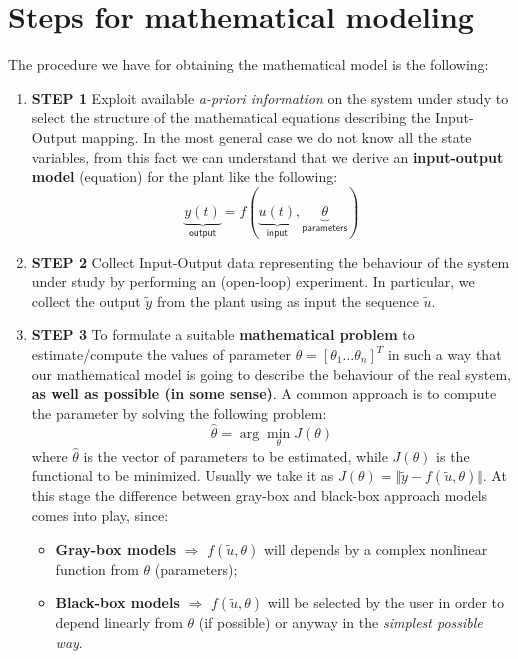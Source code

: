 \section{Steps for mathematical modeling}
The procedure we have for obtaining the mathematical model  is the following:
\begin{enumerate}
    \item \textsf{\textbf{STEP 1}} Exploit available \textit{a-priori information} on the system under study to select the structure of the mathematical equations describing the Input-Output mapping. In the most general case we do not know all the state variables, from this fact we can understand that we derive an \textbf{input-output model} (equation) for the plant like the following:
    \begin{equation}
        \underbrace{y(t)}_{\textsf{output}}=
        f( \underbrace{u(t)}_{\textsf{input}}, \underbrace{\theta}_{\textsf{parameters}})
    \end{equation}
    \item \textsf{\textbf{STEP 2}} Collect Input-Output data representing the behaviour of the system under study by performing an (open-loop) experiment. In particular, we collect the output $\tilde{y}$ from the plant using as input the sequence $\tilde{u}$.
    \item \textsf{\textbf{STEP 3}} To formulate a suitable \textbf{mathematical problem} to estimate/compute the values of parameter $\theta=[\theta_1...\theta_n]^T$ in such a way that our mathematical model is going to describe the behaviour of the real system, \textbf{as well as possible (in some sense)}. A common approach is to compute the parameter by solving the following problem:
    \begin{equation} \label{eq:problem}
        \hat{\theta} = \arg\min_{\theta}{J(\theta)}
    \end{equation}
    where $\hat{\theta}$ is the vector of parameters to be estimated, while $J(\theta)$ is the functional to be minimized. Usually we take it as $J(\theta)=\Vert \tilde{y}-f(\tilde{u}, \theta)\Vert$.
    At this stage the difference between gray-box and black-box approach models comes into play, since:
    \begin{itemize}
        \item \textbf{Gray-box models} $\Longrightarrow$ $f(\tilde{u}, \theta)$ will depends by a complex nonlinear function from $\theta$ (parameters); 
        \item \textbf{Black-box models} $\Longrightarrow$ $f(\tilde{u}, \theta)$ will be selected by the user in order to depend linearly from $\theta$ (if possible) or anyway in the \textit{simplest possible way}.
    \end{itemize}
\end{enumerate}

